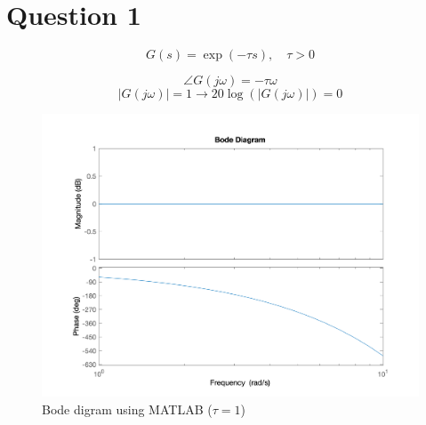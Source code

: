 \section{Question 1}
$$
G(s) = \exp(-\tau s), \quad \tau > 0
$$

$$
\angle G(j\omega) = -\tau \omega
$$
$$
\left\vert G(j\omega) \right\vert = 1 \to 20\log(\left\vert G(j\omega) \right\vert) = 0
$$
\begin{figure}[H]
	\caption{Bode digram using MATLAB ($\tau = 1$)}
	\centering
	\includegraphics[width=12cm]{../Figure/Q1/bode.png}
\end{figure}

